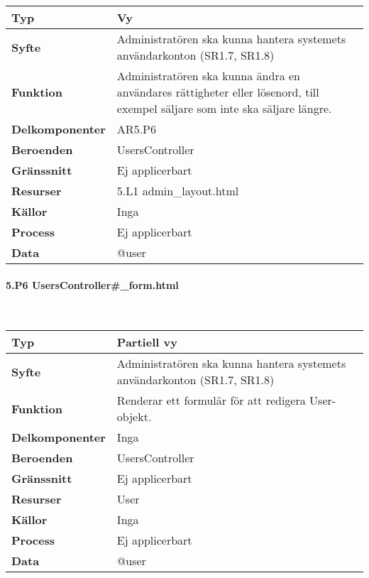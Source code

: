 \documentclass[a4paper, twoside, 11pt, titlepage]{article}
\begin{document}
			\begin {table} [ht] \begin{tabular} {  p{3.5cm} p{11.6cm} }
				\hline
				{\sffamily\textbf{Typ}} & {Vy} \\
				\hline
				{\sffamily\textbf{Syfte}} & {Administratören ska kunna hantera systemets användarkonton (SR1.7, SR1.8)} \\
				\hline
				{\sffamily\textbf{Funktion}} & {Administratören ska kunna ändra en användares rättigheter eller lösenord, till exempel säljare som inte ska säljare längre.} \\
				\hline
				{\sffamily\textbf{Delkomponenter}} & {AR5.P6} \\
				\hline
				{\sffamily\textbf{Beroenden}} & {UsersController} \\
				\hline
				{\sffamily\textbf{Gränssnitt}} & {Ej applicerbart} \\
				\hline
				{\sffamily\textbf{Resurser}} & {5.L1 admin\_layout.html} \\
				\hline
				{\sffamily\textbf{Källor}} & {Inga} \\
				\hline
				{\sffamily\textbf{Process}} & {Ej applicerbart} \\
				\hline
				{\sffamily\textbf{Data}} & {@user} \\
				\hline
			\end{tabular} \end{table} \FloatBarrier


			\clearpage %
			\paragraph{5.P6 UsersController\#\_form.html}\

			\begin {table} [ht] \begin{tabular} {  p{3.5cm} p{11.6cm} }
				\hline
				{\sffamily\textbf{Typ}} & {Partiell vy} \\
				\hline
				{\sffamily\textbf{Syfte}} & {Administratören ska kunna hantera systemets användarkonton (SR1.7, SR1.8)} \\
				\hline
				{\sffamily\textbf{Funktion}} & {Renderar ett formulär för att redigera User-objekt.} \\
				\hline
				{\sffamily\textbf{Delkomponenter}} & {Inga} \\
				\hline
				{\sffamily\textbf{Beroenden}} & {UsersController} \\
				\hline
				{\sffamily\textbf{Gränssnitt}} & {Ej applicerbart} \\
				\hline
				{\sffamily\textbf{Resurser}} & {User} \\
				\hline
				{\sffamily\textbf{Källor}} & {Inga} \\
				\hline
				{\sffamily\textbf{Process}} & {Ej applicerbart} \\
				\hline
				{\sffamily\textbf{Data}} & {@user} \\
				\hline
			\end{tabular} \end{table} \FloatBarrier
\end{document}
